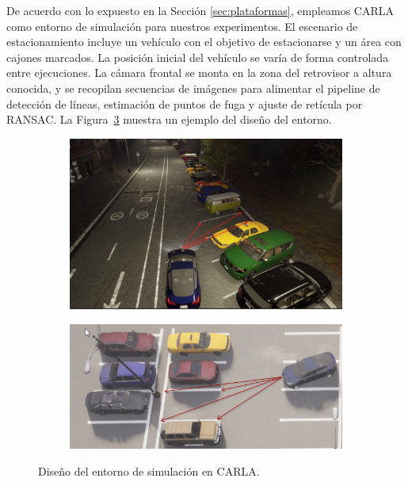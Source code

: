 
De acuerdo con lo expuesto en la Sección \ref{sec:plataformas},
empleamos CARLA como entorno de simulación para nuestros experimentos.
El escenario de estacionamiento incluye un vehículo con el objetivo de estacionarse y un área con cajones marcados.
La posición inicial del vehículo se varía de forma controlada entre ejecuciones.
La cámara frontal se monta en la zona del retrovisor a altura conocida,
y se recopilan secuencias de imágenes para alimentar el pipeline de detección de líneas,
estimación de puntos de fuga y ajuste de retícula por RANSAC.
La Figura~\ref{fig:simulation-design} muestra un ejemplo del diseño del entorno.

\begin{figure}[!ht]
    \centering
    \begin{subfigure}{0.4\textwidth}
        \includegraphics[width=\textwidth]{img/distances}\label {fig:distances}
    \end{subfigure}
    \begin{subfigure}{0.4\textwidth}
        \includegraphics[width=\textwidth]{img/distances2}\label {fig:distances2}
    \end{subfigure}

    \caption{Diseño del entorno de simulación en CARLA.}
    \label{fig:simulation-design}
\end{figure}


